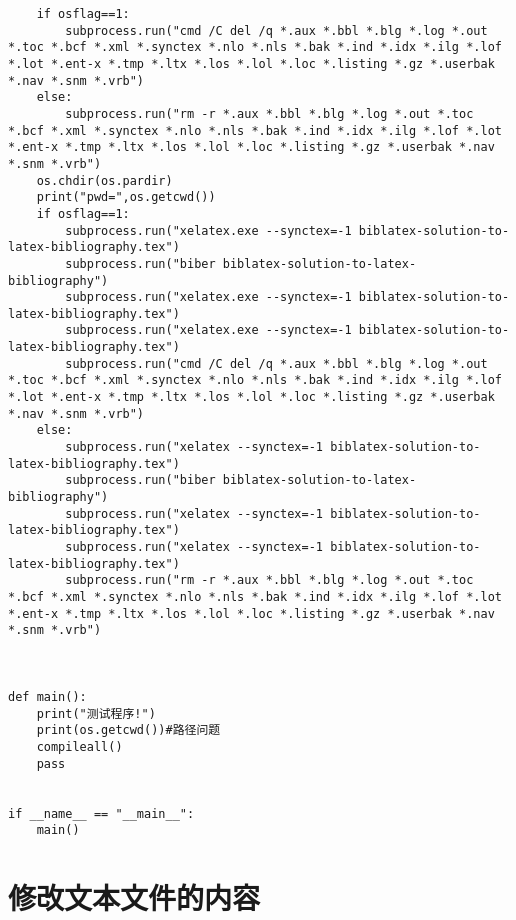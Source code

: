 \documentclass[twoside,11pt]{book}
\begin{document}
\begin{lstlisting}
    if osflag==1:
        subprocess.run("cmd /C del /q *.aux *.bbl *.blg *.log *.out *.toc *.bcf *.xml *.synctex *.nlo *.nls *.bak *.ind *.idx *.ilg *.lof *.lot *.ent-x *.tmp *.ltx *.los *.lol *.loc *.listing *.gz *.userbak *.nav *.snm *.vrb")
    else:
        subprocess.run("rm -r *.aux *.bbl *.blg *.log *.out *.toc *.bcf *.xml *.synctex *.nlo *.nls *.bak *.ind *.idx *.ilg *.lof *.lot *.ent-x *.tmp *.ltx *.los *.lol *.loc *.listing *.gz *.userbak *.nav *.snm *.vrb")
    os.chdir(os.pardir)
    print("pwd=",os.getcwd())
    if osflag==1:
        subprocess.run("xelatex.exe --synctex=-1 biblatex-solution-to-latex-bibliography.tex")
        subprocess.run("biber biblatex-solution-to-latex-bibliography")
        subprocess.run("xelatex.exe --synctex=-1 biblatex-solution-to-latex-bibliography.tex")
        subprocess.run("xelatex.exe --synctex=-1 biblatex-solution-to-latex-bibliography.tex")
        subprocess.run("cmd /C del /q *.aux *.bbl *.blg *.log *.out *.toc *.bcf *.xml *.synctex *.nlo *.nls *.bak *.ind *.idx *.ilg *.lof *.lot *.ent-x *.tmp *.ltx *.los *.lol *.loc *.listing *.gz *.userbak *.nav *.snm *.vrb")
    else:
        subprocess.run("xelatex --synctex=-1 biblatex-solution-to-latex-bibliography.tex")
        subprocess.run("biber biblatex-solution-to-latex-bibliography")
        subprocess.run("xelatex --synctex=-1 biblatex-solution-to-latex-bibliography.tex")
        subprocess.run("xelatex --synctex=-1 biblatex-solution-to-latex-bibliography.tex")
        subprocess.run("rm -r *.aux *.bbl *.blg *.log *.out *.toc *.bcf *.xml *.synctex *.nlo *.nls *.bak *.ind *.idx *.ilg *.lof *.lot *.ent-x *.tmp *.ltx *.los *.lol *.loc *.listing *.gz *.userbak *.nav *.snm *.vrb")



def main():
    print("测试程序!")
    print(os.getcwd())#路径问题
    compileall()
    pass


if __name__ == "__main__":
    main()
\end{lstlisting}

\section{修改文本文件的内容}
\end{document}

